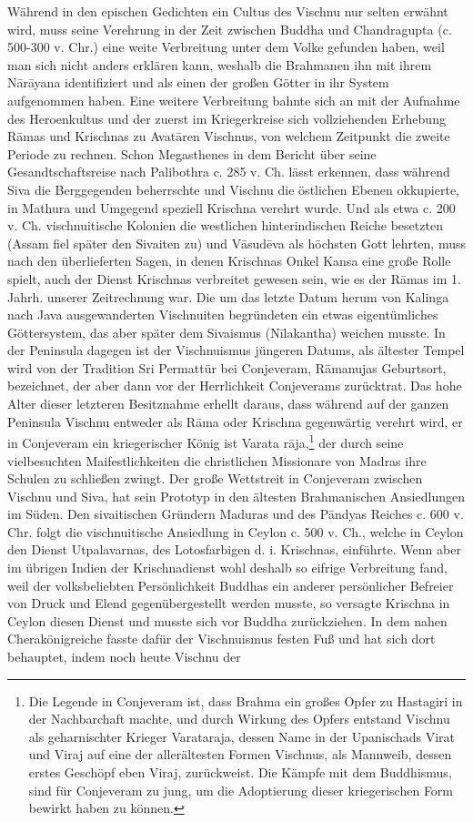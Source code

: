 \documentclass{article}
\begin{document}
Während in den epischen Gedichten ein Cultus des Vischnu nur selten erwähnt wird, muss seine Verehrung in der Zeit zwischen Buddha und Chandragupta (c. 500-300 v. Chr.) eine weite Verbreitung unter dem Volke gefunden haben, weil man sich nicht anders erklären kann, weshalb die Brahmanen ihn mit ihrem N\={a}r\={a}yana identifiziert und als einen der großen Götter in ihr System aufgenommen haben. Eine weitere Verbreitung bahnte sich an mit der Aufnahme des Heroenkultus und der zuerst im Kriegerkreise sich vollziehenden Erhebung R\={a}mas und Krischnas zu Avat\={a}ren Vischnus, von welchem Zeitpunkt die zweite Periode zu rechnen. Schon Megasthenes in dem Bericht über seine Gesandtschaftsreise nach Palibothra c. 285 v. Ch. lässt erkennen, dass während Siva die Berggegenden beherrschte und Vischnu die östlichen Ebenen okkupierte, in Mathura und Umgegend speziell Krischna verehrt wurde. Und als etwa c. 200 v. Ch. vischnuitische Kolonien die westlichen hinterindischen Reiche besetzten (Assam fiel später den Sivaiten zu) und V\={a}sud\={e}va als höchsten Gott lehrten, muss nach den überlieferten Sagen, in denen Krischnas Onkel Kansa eine große Rolle spielt, auch der Dienst Krischnas verbreitet gewesen sein, wie es der R\={a}mas im 1. Jahrh. unserer Zeitrechnung war. Die um das letzte Datum herum von Kalinga nach Java ausgewanderten Vischnuiten begründeten ein etwas eigentümliches Göttersystem, das aber später dem Sivaismus (N\={i}lakantha) weichen musste. In der Peninsula dagegen ist der Vischnuismus jüngeren Datums, als ältester Tempel wird von der Tradition Sri Permatt\={u}r bei Conjeveram, R\={a}manujas Geburtsort, bezeichnet, der aber dann vor der Herrlichkeit Conjeverams zurücktrat. Das hohe Alter dieser letzteren Besitznahme erhellt daraus, dass während auf der ganzen Peninsula Vischnu entweder als R\={a}ma oder Krischna gegenwärtig verehrt wird, er in Conjeveram ein kriegerischer König ist Varata r\={a}ja,\footnote{Die Legende in Conjeveram ist, dass Brahma ein großes Opfer zu Hastagiri in der Nachbarchaft machte, und durch Wirkung des Opfers entstand Vischnu als geharnischter Krieger Varataraja, dessen Name in der Upanischads Virat und Viraj auf eine der allerältesten Formen Vischnus, als Mannweib, dessen erstes Geschöpf eben Viraj, zurückweist. Die Kämpfe mit dem Buddhismus, sind für Conjeveram zu jung, um die Adoptierung dieser kriegerischen Form bewirkt haben zu können.} der durch seine vielbesuchten Maifestlichkeiten die christlichen Missionare von Madras ihre Schulen zu schließen zwingt. Der große Wettstreit in Conjeveram zwischen Vischnu und Siva, hat sein Prototyp in den ältesten Brahmanischen Ansiedlungen im Süden. Den sivaitischen Gründern Maduras und des P\={a}ndyas Reiches c. 600 v. Chr. folgt die vischnuitische Ansiedlung in Ceylon c. 500 v. Ch., welche in Ceylon den Dienst Utpalavarnas, des Lotosfarbigen d. i. Krischnas, einführte. Wenn aber im übrigen Indien der Krischnadienst wohl deshalb so eifrige Verbreitung fand, weil der volksbeliebten Persönlichkeit Buddhas ein anderer persönlicher Befreier von Druck und Elend gegenübergestellt werden musste, so versagte Krischna in Ceylon diesen Dienst und musste sich vor Buddha zurückziehen. In dem nahen Cherakönigreiche fasste dafür der Vischnuismus festen Fuß und hat sich dort behauptet, indem noch heute Vischnu der 
\end{document}
